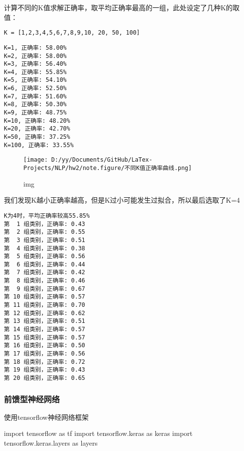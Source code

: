 \documentclass[
]{article}
\newenvironment{Shaded}{}{}
\newcommand{\ImportTok}[1]{#1}
\newcommand{\NormalTok}[1]{#1}
\begin{document}
计算不同的K值求解正确率，取平均正确率最高的一组，此处设定了几种K的取值：

\texttt{K\ =\ {[}1,2,3,4,5,6,7,8,9,10,\ 20,\ 50,\ 100{]}}

\begin{verbatim}
K=1, 正确率: 58.00%
K=2, 正确率: 58.00%
K=3, 正确率: 56.40%
K=4, 正确率: 55.85%
K=5, 正确率: 54.10%
K=6, 正确率: 52.50%
K=7, 正确率: 51.60%
K=8, 正确率: 50.30%
K=9, 正确率: 48.75%
K=10, 正确率: 48.20%
K=20, 正确率: 42.70%
K=50, 正确率: 37.25%
K=100, 正确率: 33.55%
\end{verbatim}

\begin{figure}
\centering
\texttt{[image: D:/yy/Documents/GitHub/LaTex-Projects/NLP/hw2/note.figure/不同K值正确率曲线.png]}
\caption{img}
\end{figure}

我们发现K越小正确率越高，但是K过小可能发生过拟合，所以最后选取了K=4

\begin{verbatim}
K为4时，平均正确率较高55.85%
第  1 组类别，正确率: 0.43
第  2 组类别，正确率: 0.55
第  3 组类别，正确率: 0.51
第  4 组类别，正确率: 0.38
第  5 组类别，正确率: 0.56
第  6 组类别，正确率: 0.44
第  7 组类别，正确率: 0.42
第  8 组类别，正确率: 0.46
第  9 组类别，正确率: 0.67
第 10 组类别，正确率: 0.57
第 11 组类别，正确率: 0.70
第 12 组类别，正确率: 0.62
第 13 组类别，正确率: 0.51
第 14 组类别，正确率: 0.57
第 15 组类别，正确率: 0.57
第 16 组类别，正确率: 0.50
第 17 组类别，正确率: 0.56
第 18 组类别，正确率: 0.72
第 19 组类别，正确率: 0.43
第 20 组类别，正确率: 0.65
\end{verbatim}

\hypertarget{ux524dux9988ux578bux795eux7ecfux7f51ux7edc}{%
\subsubsection{前馈型神经网络}\label{ux524dux9988ux578bux795eux7ecfux7f51ux7edc}}

使用tensorflow神经网络框架

\begin{Shaded}
\begin{Highlighting}[]
\ImportTok{import}\NormalTok{ tensorflow }\ImportTok{as}\NormalTok{ tf}
\ImportTok{import}\NormalTok{ tensorflow.keras }\ImportTok{as}\NormalTok{ keras}
\ImportTok{import}\NormalTok{ tensorflow.keras.layers }\ImportTok{as}\NormalTok{ layers}
\end{Highlighting}
\end{Shaded}
\end{document}
